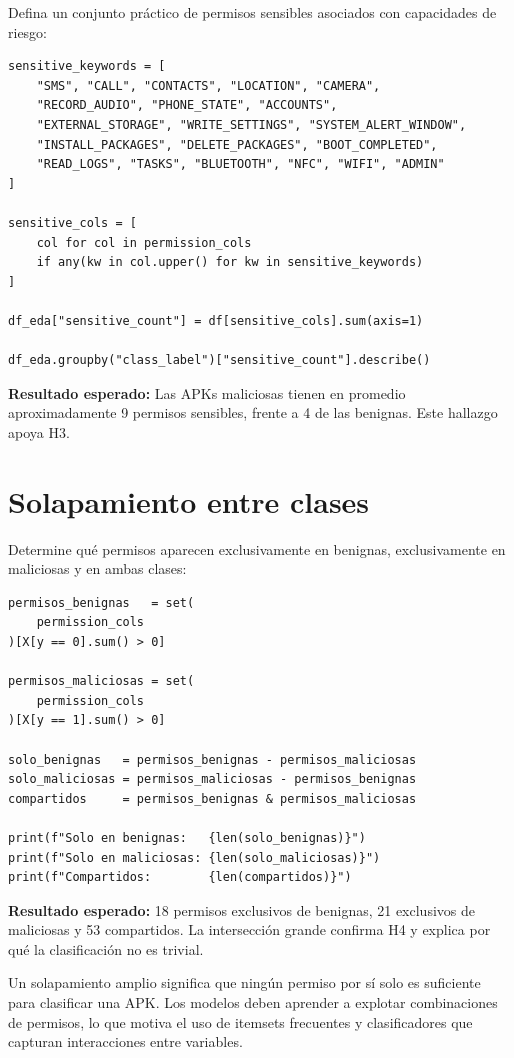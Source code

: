\documentclass[
  coursetitle={Cómputo Nube y Tecnologías Emergentes},
  coursehours={96},
  coursedate={Verano 2026},
  doctype={Tutorial},
  otherlangs={english,french},
  authorname={Lázaro},
  authorsurname={Bustio-Martínez},
  authortitle={PhD},
  role={Profesor Investigador},
  email={lbustio@inaoe.mx},
  phone={5559504000},
  ext={7459},
  institution={Instituto Nacional de Astrofísica, Óptica y Electrónica (INAOE)},
  department={Maestría en Ciencias en Tecnologías de Seguridad},
  address={Luis Enrique Erro 1, Sta. Ma. Tonantzintla, San Andrés Cholula, CP 72840, Puebla, México},
  margin={0.5in}
]{../../lbustio_lecture_notes}
\begin{document}
Defina un conjunto práctico de permisos sensibles asociados con capacidades de riesgo:

\begin{lstlisting}
sensitive_keywords = [
    "SMS", "CALL", "CONTACTS", "LOCATION", "CAMERA",
    "RECORD_AUDIO", "PHONE_STATE", "ACCOUNTS",
    "EXTERNAL_STORAGE", "WRITE_SETTINGS", "SYSTEM_ALERT_WINDOW",
    "INSTALL_PACKAGES", "DELETE_PACKAGES", "BOOT_COMPLETED",
    "READ_LOGS", "TASKS", "BLUETOOTH", "NFC", "WIFI", "ADMIN"
]

sensitive_cols = [
    col for col in permission_cols
    if any(kw in col.upper() for kw in sensitive_keywords)
]

df_eda["sensitive_count"] = df[sensitive_cols].sum(axis=1)

df_eda.groupby("class_label")["sensitive_count"].describe()
\end{lstlisting}

\textbf{Resultado esperado:} Las APKs maliciosas tienen en promedio aproximadamente 9 permisos sensibles, frente a 4 de las benignas. Este hallazgo apoya H3.

\section{Solapamiento entre clases}

Determine qué permisos aparecen exclusivamente en benignas, exclusivamente en maliciosas y en ambas clases:

\begin{lstlisting}
permisos_benignas   = set(
    permission_cols
)[X[y == 0].sum() > 0]

permisos_maliciosas = set(
    permission_cols
)[X[y == 1].sum() > 0]

solo_benignas   = permisos_benignas - permisos_maliciosas
solo_maliciosas = permisos_maliciosas - permisos_benignas
compartidos     = permisos_benignas & permisos_maliciosas

print(f"Solo en benignas:   {len(solo_benignas)}")
print(f"Solo en maliciosas: {len(solo_maliciosas)}")
print(f"Compartidos:        {len(compartidos)}")
\end{lstlisting}

\textbf{Resultado esperado:} 18 permisos exclusivos de benignas, 21 exclusivos de maliciosas y 53 compartidos. La intersección grande confirma H4 y explica por qué la clasificación no es trivial.

\begin{tcolorbox}[title=Interpretación]
Un solapamiento amplio significa que ningún permiso por sí solo es suficiente para clasificar una APK. Los modelos deben aprender a explotar combinaciones de permisos, lo que motiva el uso de itemsets frecuentes y clasificadores que capturan interacciones entre variables.
\end{tcolorbox}
\end{document}
